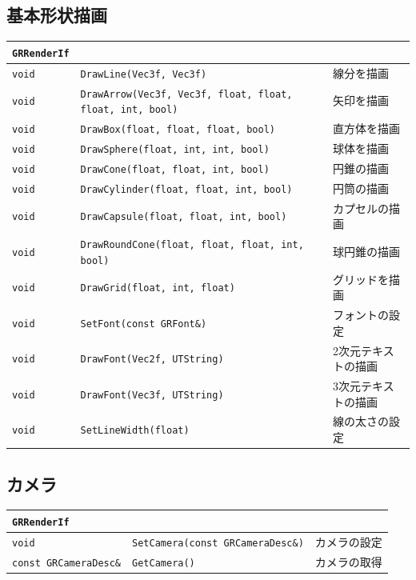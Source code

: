 \subsection*{基本形状描画}

\begin{center}
\begin{tabular}{p{.1\hsize}p{.5\hsize}p{.3\hsize}}
\texttt{GRRenderIf}																					\\ \midrule
\texttt{void} & \texttt{DrawLine(Vec3f, Vec3f)}											& 線分を描画	\\
\texttt{void} & \texttt{DrawArrow(Vec3f, Vec3f, float, float, float, int, bool)}			& 矢印を描画	\\
\texttt{void} & \texttt{DrawBox(float, float, float, bool)}								& 直方体を描画	\\
\texttt{void} & \texttt{DrawSphere(float, int, int, bool)}									& 球体を描画	\\
\texttt{void} & \texttt{DrawCone(float, float, int, bool)}									& 円錐の描画	\\
\texttt{void} & \texttt{DrawCylinder(float, float, int, bool)}								& 円筒の描画	\\
\texttt{void} & \texttt{DrawCapsule(float, float, int, bool)}								& カプセルの描画	\\
\texttt{void} & \texttt{DrawRoundCone(float, float, float, int, bool)}						& 球円錐の描画	\\
\texttt{void} & \texttt{DrawGrid(float, int, float)}										& グリッドを描画	\\
\texttt{void} & \texttt{SetFont(const GRFont\&)}											& フォントの設定	\\
\texttt{void} & \texttt{DrawFont(Vec2f, UTString)}											& 2次元テキストの描画	\\
\texttt{void} & \texttt{DrawFont(Vec3f, UTString)}											& 3次元テキストの描画	\\
\texttt{void} & \texttt{SetLineWidth(float)}												& 線の太さの設定	\\
\end{tabular}
\end{center}

\subsection*{カメラ}

\begin{center}
\begin{tabular}{p{.27\hsize}p{.45\hsize}p{.18\hsize}}
\texttt{GRRenderIf}												\\ \midrule
\texttt{void} 					& \texttt{SetCamera(const GRCameraDesc\&)}	& カメラの設定	\\
\texttt{const GRCameraDesc\&} 	& \texttt{GetCamera()}						& カメラの取得	\\
\end{tabular}
\end{center}

